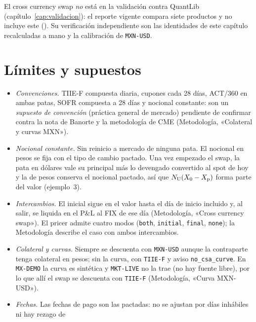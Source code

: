 El cross currency swap \emph{no} está en la validación contra QuantLib (capítulo~\ref{cap:validacion}): el reporte
vigente compara siete productos y no incluye este (). Su
verificación independiente son las identidades de este capítulo recalculadas a mano y la calibración de
\texttt{MXN-USD}.

\section{Límites y supuestos}\label{sec:cap07-limites}

\begin{limites}
  \begin{itemize}
    \item \emph{Convenciones.} TIIE-F compuesta diaria, cupones cada 28 días, ACT/360 en ambas patas, SOFR
          compuesta a 28 días y nocional constante: son un \emph{supuesto de convención} (práctica general
          de mercado) pendiente de confirmar contra la nota de Banorte y la metodología de CME (Metodología,
          «Colateral y curvas MXN»).
    \item \emph{Nocional constante.} Sin reinicio a mercado de ninguna pata. El nocional en pesos se fija con
          el tipo de cambio pactado. Una vez empezado el swap, la pata en dólares vale su principal más lo
          devengado convertido al spot de hoy y la de pesos conserva el nocional pactado, así que
          $N_{\mathrm U}(X_0-X_{\mathrm p})$ forma parte del valor (ejemplo~3).
    \item \emph{Intercambios.} El inicial sigue en el valor hasta el día de inicio incluido y, al salir, se
          liquida en el P\&L al FIX de ese día (Metodología, «Cross currency swap»). El pricer admite cuatro modos
          (\texttt{both}, \texttt{initial}, \texttt{final}, \texttt{none}); la Metodología describe el caso con
          ambos intercambios.
    \item \emph{Colateral y curvas.} Siempre se descuenta con \texttt{MXN-USD} aunque la contraparte tenga
          colateral en pesos; sin la curva, con \texttt{TIIE-F} y aviso \texttt{no\_csa\_curve}. En \texttt{MX-DEMO}
          la curva es sintética y \texttt{MKT-LIVE} no la trae (no hay fuente libre), por lo que allí el swap
          se descuenta con \texttt{TIIE-F} (Metodología, «Curva MXN-USD»).
    \item \emph{Fechas.} Las fechas de pago son las pactadas: no se ajustan por días inhábiles ni hay rezago de

\end{itemize}
\end{limites}
